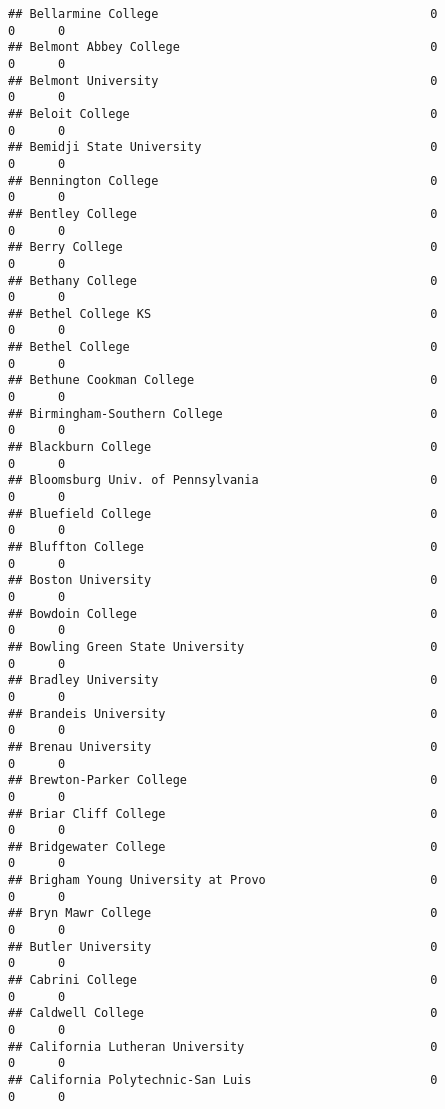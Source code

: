 \documentclass[
]{article}
\begin{document}
\begin{verbatim}
## Bellarmine College                                      0          0      0
## Belmont Abbey College                                   0          0      0
## Belmont University                                      0          0      0
## Beloit College                                          0          0      0
## Bemidji State University                                0          0      0
## Bennington College                                      0          0      0
## Bentley College                                         0          0      0
## Berry College                                           0          0      0
## Bethany College                                         0          0      0
## Bethel College KS                                       0          0      0
## Bethel College                                          0          0      0
## Bethune Cookman College                                 0          0      0
## Birmingham-Southern College                             0          0      0
## Blackburn College                                       0          0      0
## Bloomsburg Univ. of Pennsylvania                        0          0      0
## Bluefield College                                       0          0      0
## Bluffton College                                        0          0      0
## Boston University                                       0          0      0
## Bowdoin College                                         0          0      0
## Bowling Green State University                          0          0      0
## Bradley University                                      0          0      0
## Brandeis University                                     0          0      0
## Brenau University                                       0          0      0
## Brewton-Parker College                                  0          0      0
## Briar Cliff College                                     0          0      0
## Bridgewater College                                     0          0      0
## Brigham Young University at Provo                       0          0      0
## Bryn Mawr College                                       0          0      0
## Butler University                                       0          0      0
## Cabrini College                                         0          0      0
## Caldwell College                                        0          0      0
## California Lutheran University                          0          0      0
## California Polytechnic-San Luis                         0          0      0

\end{verbatim}
\end{document}
